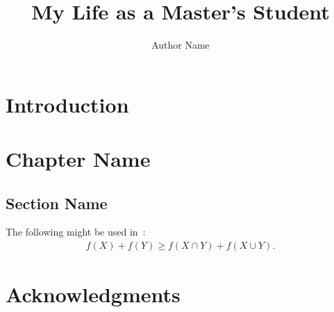 \documentclass[suri,hyperref]{engsuribt} %
\title{My Life as a Master's Student}
\author{Author Name}
\begin{document}
\maketitle

\frontmatter
\begin{abstract}
  \lipsum[1-2]
\end{abstract}

\tableofcontents

\mainmatter
\chapter{Introduction}
\lipsum[1]

\chapter{Chapter Name}
\lipsum[1]

\section{Section Name}
The following might be used in~\cite{Adams1995}:
\begin{align}
  f(X) + f(Y) \ge f(X \cap Y) + f(X \cup Y).
\end{align}

\backmatter
\chapter{Acknowledgments}
\lipsum[1]

\printbibliography[heading=bibintoc]
\end{document}
